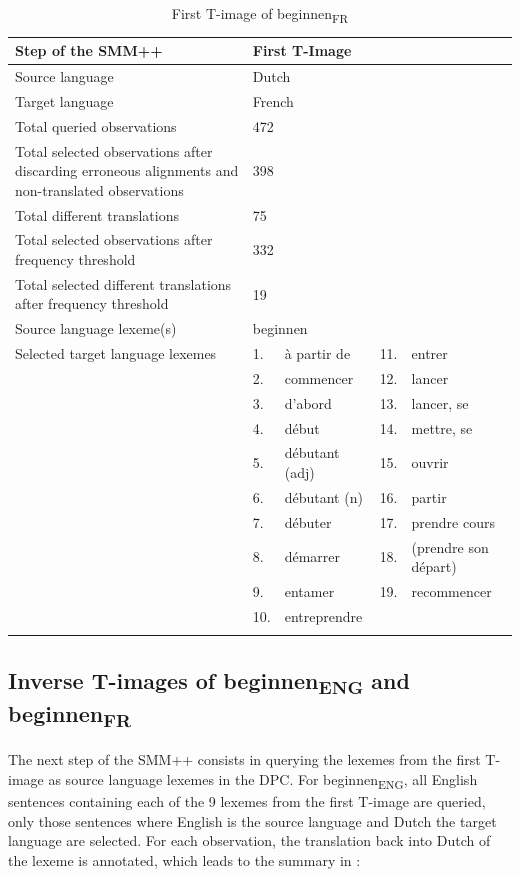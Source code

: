 \begin{table}
\caption{First T-image of beginnen\textsubscript{FR}\label{tab:3:7}}
\small
\begin{tabularx}{\textwidth}{p{}lXlX}
\lsptoprule
Step of the SMM++ & \multicolumn{4}{l}{First T-Image}\\ \midrule
\rowcolor{lsLightGray}Source language & \multicolumn{4}{l}{Dutch}\\
Target language & \multicolumn{4}{l}{French}\\
\rowcolor{lsLightGray}Total queried observations & \multicolumn{4}{l}{472}\\
Total selected observations after discarding erroneous alignments and non-translated observations & \multicolumn{4}{l}{398}\\
\rowcolor{lsLightGray}Total different translations & \multicolumn{4}{l}{75}\\
Total selected observations after frequency threshold & \multicolumn{4}{l}{332}\\
\rowcolor{lsLightGray}Total selected different translations after frequency threshold & \multicolumn{4}{l}{19}\\
Source language lexeme(s) & \multicolumn{4}{l}{beginnen}\\
\rowcolor{lsLightGray}Selected target language lexemes &  1.& à partir de & 11.& entrer \\ 
\rowcolor{lsLightGray}& 2. & commencer & 12.& lancer \\ 
\rowcolor{lsLightGray}& 3. & d'abord & 13.& lancer, se \\
\rowcolor{lsLightGray}& 4. & début & 14.& mettre, se \\  
\rowcolor{lsLightGray}& 5. & débutant (adj) & 15.& ouvrir \\
\rowcolor{lsLightGray}& 6. & débutant (n) & 16.& partir \\ 
\rowcolor{lsLightGray}& 7. & débuter & 17.& prendre cours \\  
\rowcolor{lsLightGray}& 8. & démarrer & 18.& (prendre son départ) \\  
\rowcolor{lsLightGray}& 9. &entamer & 19.& recommencer \\
\rowcolor{lsLightGray}& 10.& entreprendre &&  \\
\lspbottomrule
\end{tabularx}
\end{table}

\subsection{Inverse T-images of beginnen\textsubscript{ENG} and beginnen\textsubscript{FR}}
\label{sec:3.6.2}
The next step of the SMM++ consists in querying the lexemes from the first T-image as source language lexemes in the DPC. For beginnen\textsubscript{ENG}, all English sentences containing each of the 9 lexemes from the first T-image are queried, only those sentences where English is the source language and Dutch the target language are selected. For each observation, the translation back into Dutch of the lexeme is annotated, which leads to the summary in :

